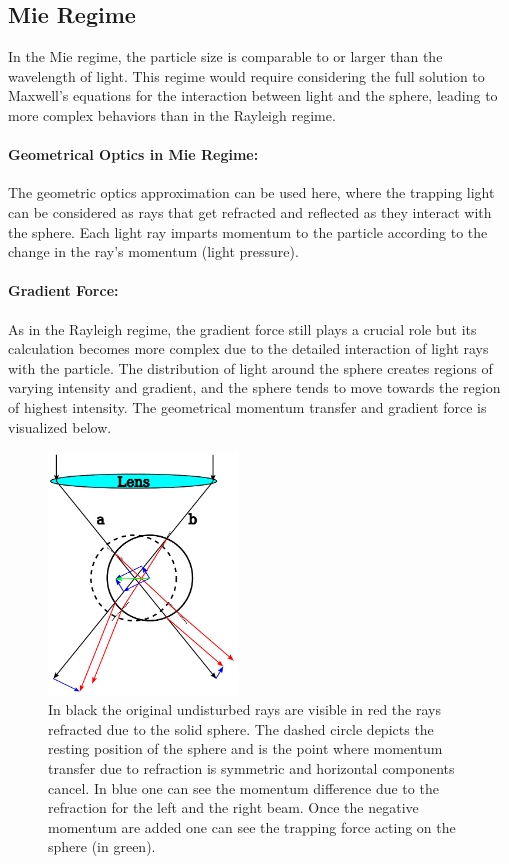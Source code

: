 \documentclass[12pt,english]{scrartcl}
\begin{document}
\subsection{Mie Regime}

In the Mie regime, the particle size is comparable to or larger than the
wavelength of light. This regime would require considering the full solution to
Maxwell's equations for the interaction between light and the sphere, leading
to more complex behaviors than in the Rayleigh regime.

\paragraph{Geometrical Optics in Mie Regime:}
The geometric optics approximation can be used here, where the trapping light
can be considered as rays that get refracted and reflected as they interact
with the sphere. Each light ray imparts momentum to the particle according to
the change in the ray's momentum (light pressure).

\paragraph{Gradient Force:}
As in the Rayleigh regime, the gradient force still plays a crucial role but
its calculation becomes more complex due to the detailed interaction of light
rays with the particle. The distribution of light around the sphere creates
regions of varying intensity and gradient, and the sphere tends to move towards
the region of highest intensity. The geometrical momentum transfer and gradient
force is visualized below.\cite{bustamanteOpticalTweezersSinglemolecule2021}

\begin{figure}[H]
	\centering
	\includegraphics[width=0.45\textwidth]{figures/mieworkingprinciple.pdf}
	\caption[Working principle of optical tweezers in mie regime]{In black the original
		undisturbed rays are visible in red the rays refracted due to the solid sphere.
		The dashed circle depicts the resting position of the sphere and is the point
		where momentum transfer due to refraction is symmetric and horizontal
		components cancel. In blue one can see the momentum difference due to the
		refraction for the left and the right beam. Once the negative momentum are
		added one can see the trapping force acting on the sphere (in green).
	}\label{fig:mie_working_principle}
\end{figure}
\end{document}
